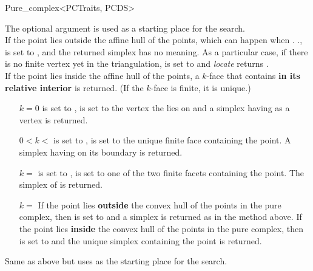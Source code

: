\begin{ccRefClass}{Pure_complex<PCTraits, PCDS>}
{The optional argument  is used as a starting place for the
search.\\ If the  point lies outside the affine hull of the points,
which can happen when \ccVar.
\ccVar.,  is set to
, and the returned simplex has no meaning. As a
particular case, if there is no finite vertex yet in the triangulation,
 is set to  and \textit{locate} returns
.\\ If the  point lies inside the affine hull
of the points, a $k$-face that contains  \textbf{in its relative
interior} is returned. (If the $k$-face is finite, it is
unique.)\begin{itemize} \item[$k=0$]  is set to ,
 is set to the vertex  the  lies on and a simplex
having  as a vertex is returned.
\item[$0<k<$\ccc{c.current_dimension()-1}]  is set to
,  is set to the unique finite face containing the
 point. A simplex having  on its boundary is returned.
\item[$k=$\ccc{c.current_dimension()-1}]  is set to
,  is set to one of the two finite facets containing the
 point. The simplex of  is returned.
\item[$k=$\ccc{c.current_dimension()}] If the  point lies
\textbf{outside} the convex hull of the points in the pure complex, then
 is set to  and a simplex is returned
as in the  method above. If the  point lies
\textbf{inside} the convex hull of the points in the pure complex, then
 is set to  and the unique simplex containing
the  point is returned. \end{itemize}}

{Same as above but uses  as the starting place for the search.}



\end{ccRefClass}
